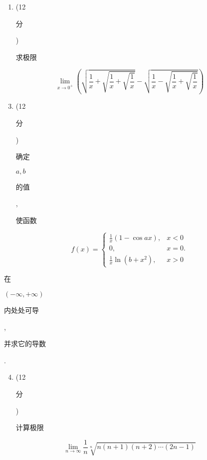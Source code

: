 \documentclass[10pt]{article}
\begin{document}
\begin{enumerate}
  \item (12 \begin{CJK}{UTF8}{mj}分\end{CJK}) \begin{CJK}{UTF8}{mj}求极限\end{CJK}
\end{enumerate}
$$
\lim _{x \rightarrow 0^{+}}\left(\sqrt{\frac{1}{x}+\sqrt{\frac{1}{x}+\sqrt{\frac{1}{x}}}}-\sqrt{\frac{1}{x}-\sqrt{\frac{1}{x}+\sqrt{\frac{1}{x}}}}\right)
$$

\begin{enumerate}
  \setcounter{enumi}{2}
  \item (12 \begin{CJK}{UTF8}{mj}分\end{CJK}) \begin{CJK}{UTF8}{mj}确定\end{CJK} $a, b$ \begin{CJK}{UTF8}{mj}的值\end{CJK}, \begin{CJK}{UTF8}{mj}使函数\end{CJK}
\end{enumerate}
$$
f(x)=\left\{\begin{array}{cl}
\frac{1}{x}(1-\cos a x), & x<0 \\
0, & x=0 . \\
\frac{1}{x} \ln \left(b+x^{2}\right), & x>0
\end{array}\right.
$$
\begin{CJK}{UTF8}{mj}在\end{CJK} $(-\infty,+\infty)$ \begin{CJK}{UTF8}{mj}内处处可导\end{CJK}, \begin{CJK}{UTF8}{mj}并求它的导数\end{CJK}.

\begin{enumerate}
  \setcounter{enumi}{3}
  \item (12 \begin{CJK}{UTF8}{mj}分\end{CJK}) \begin{CJK}{UTF8}{mj}计算极限\end{CJK}
\end{enumerate}
$$
\lim _{n \rightarrow \infty} \frac{1}{n} \sqrt[n]{n(n+1)(n+2) \cdots(2 n-1)}
$$
\end{document}
